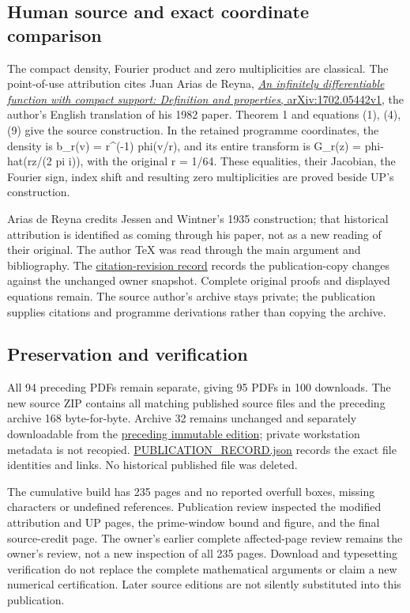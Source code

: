 \documentclass[
]{article}
\begin{document}
\subsection{Human source and exact coordinate
comparison}\label{human-source-and-exact-coordinate-comparison}

The compact density, Fourier product and zero multiplicities are
classical. The point-of-use attribution cites Juan Arias de Reyna,
\href{https://arxiv.org/abs/1702.05442v1}{\emph{An infinitely
differentiable function with compact support: Definition and
properties}, arXiv:1702.05442v1}, the author's English translation of
his 1982 paper. Theorem 1 and equations (1), (4), (9) give the source
construction. In the retained programme coordinates, the density is
b\_r(v) = r\^{}(-1) phi(v/r), and its entire transform is G\_r(z) =
phi-hat(rz/(2 pi i)), with the original r = 1/64. These equalities,
their Jacobian, the Fourier sign, index shift and resulting zero
multiplicities are proved beside UP's construction.

Arias de Reyna credits Jessen and Wintner's 1935 construction; that
historical attribution is identified as coming through his paper, not as
a new reading of their original. The author TeX was read through the
main argument and bibliography. The
\href{https://github.com/KokunoYumeto/zeta-function-research-reader/blob/84edd11df011c3e161a57dad9f083276a3c0bb95/workbenches/splitzero-tandem/branches/tau-zero-prime-positivity/CITATION_REVISION.json}{citation-revision
record} records the publication-copy changes against the unchanged owner
snapshot. Complete original proofs and displayed equations remain. The
source author's archive stays private; the publication supplies
citations and programme derivations rather than copying the archive.

\subsection{Preservation and
verification}\label{preservation-and-verification}

All 94 preceding PDFs remain separate, giving 95 PDFs in 100 downloads.
The new source ZIP contains all matching published source files and the
preceding archive 168 byte-for-byte. Archive 32 remains unchanged and
separately downloadable from the
\href{https://zenodo.org/records/22909361}{preceding immutable edition};
private workstation metadata is not recopied.
\url{PUBLICATION_RECORD.json} records the exact file identities and
links. No historical published file was deleted.

The cumulative build has 235 pages and no reported overfull boxes,
missing characters or undefined references. Publication review inspected
the modified attribution and UP pages, the prime-window bound and
figure, and the final source-credit page. The owner's earlier complete
affected-page review remains the owner's review, not a new inspection of
all 235 pages. Download and typesetting verification do not replace the
complete mathematical arguments or claim a new numerical certification.
Later source editions are not silently substituted into this
publication.
\end{document}
